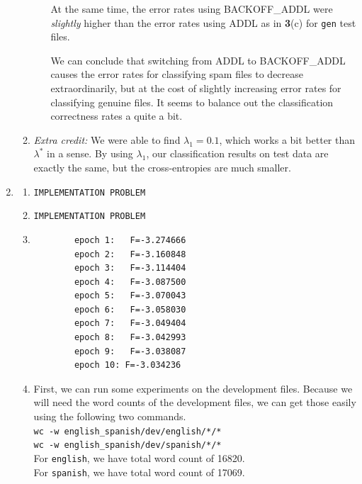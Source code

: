 \documentclass[11pt]{article}
\newcommand{\codebox}[1]{\colorbox{codegray}{\texttt{#1}}}
\begin{document}
\begin{enumerate}
\begin{enumerate}[label=(\alph*)]
\begin{itemize}
				At the same time, the error rates using BACKOFF\_ADDL were \textit{slightly} higher than the error rates using ADDL as in \textbf{3}(c) for \texttt{gen} test files. \vspace{4pt}

				We can conclude that switching from ADDL to BACKOFF\_ADDL causes the error rates for classifying spam files to decrease extraordinarily, but at the cost of slightly increasing error rates for classifying genuine files. It seems to balance out the classification correctness rates a quite a bit.
		\end{itemize}
	\item %
		\textit{Extra credit:} We were able to find $\lambda_1 = 0.1$, which works a bit better than $\lambda^*$ in a sense. By using $\lambda_1$, our classification results on test data are exactly the same, but the cross-entropies are much smaller.
	\end{enumerate}
\item %
	\begin{enumerate}[label=(\alph*)]
	\item %
		\texttt{IMPLEMENTATION PROBLEM}
	\item %
		\texttt{IMPLEMENTATION PROBLEM}
	\item %
		\begin{lstlisting}
		epoch 1:   F=-3.274666
		epoch 2:   F=-3.160848
		epoch 3:   F=-3.114404
		epoch 4:   F=-3.087500
		epoch 5:   F=-3.070043
		epoch 6:   F=-3.058030
		epoch 7:   F=-3.049404
		epoch 8:   F=-3.042993
		epoch 9:   F=-3.038087
		epoch 10: F=-3.034236
		\end{lstlisting}
	\item %
		First, we can run some experiments on the development files. Because we will need the word counts of the development files, we can get those easily using the following two commands. \vspace{4pt} \\
		\codebox{wc -w english\_spanish/dev/english/*/* \hspace{70mm}} \\
		\codebox{wc -w english\_spanish/dev/spanish/*/* \hspace{70mm}} \\

		For \texttt{english}, we have total word count of 16820. \\
		For \texttt{spanish}, we have total word count of 17069. \\


\end{enumerate}
\end{enumerate}
\end{document}
